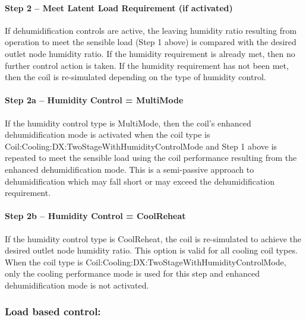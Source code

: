 \paragraph{Step 2 -- Meet Latent Load Requirement (if activated)}\label{step-2-meet-latent-load-requirement-if-activated}

If dehumidification controls are active, the leaving humidity ratio resulting from operation to meet the sensible load (Step 1 above) is compared with the desired outlet node humidity ratio. If the humidity requirement is already met, then no further control action is taken. If the humidity requirement has not been met, then the coil is re-simulated depending on the type of humidity control.

\paragraph{Step 2a -- Humidity Control = MultiMode}\label{step-2a-humidity-control-multimode}

If the humidity control type is MultiMode, then the coil's enhanced dehumidification mode is activated when the coil type is Coil:Cooling:DX:TwoStageWithHumidityControlMode and Step 1 above is repeated to meet the sensible load using the coil performance resulting from the enhanced dehumidification mode. This is a semi-passive approach to dehumidification which may fall short or may exceed the dehumidification requirement.

\paragraph{Step 2b -- Humidity Control = CoolReheat}\label{step-2b-humidity-control-coolreheat}

If the humidity control type is CoolReheat, the coil is re-simulated to achieve the desired outlet node humidity ratio. This option is valid for all cooling coil types. When the coil type is Coil:Cooling:DX:TwoStageWithHumidityControlMode, only the cooling performance mode is used for this step and enhanced dehumidification mode is not activated.

\subsubsection{Load based control:}\label{load-based-control}

